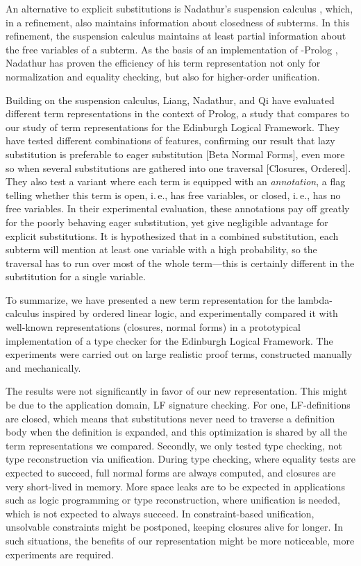 \documentclass[submission,copyright,creativecommons]{eptcs}
\newcommand{\abbrev}[1]{#1} \newcommand{\cf}{\abbrev{cf.}\ }
\newcommand{\ie}{\abbrev{i.\,e.}}
\begin{document}
An alternative to explicit substitutions is Nadathur's suspension
calculus \cite{nadathur:jflp99}, which, in a refinement, also
maintains information about closedness of subterms.  In this
refinement, the suspension calculus maintains at least partial
information about the free variables of a subterm.  
As the basis of an implementation of
-Prolog \cite{nadathur:flops01}, 
Nadathur has proven the efficiency of his term
representation not only for normalization and equality checking, but
also for higher-order unification.

Building on the suspension calculus,
Liang, Nadathur, and Qi \cite{liangNadathurQi:jar05} have evaluated
different term representations in the context of Prolog, a
study that compares to our study of term representations for the
Edinburgh Logical Framework.  They have tested different combinations
of features, confirming our result that lazy substitution is 
preferable to eager substitution {[Beta Normal Forms]},
even more so when several substitutions are gathered into one
traversal {[Closures, Ordered]}.  They also test a variant where
each term is equipped with an \emph{annotation}, a flag telling whether
this term is open, \ie, has free variables, or closed, \ie, has no
free variables.  In their experimental evaluation, these annotations
pay off greatly for the poorly behaving eager substitution, yet give
negligible advantage for explicit substitutions.  It is
hypothesized that in a combined substitution, each subterm will
mention at least one variable with a high probability, so the
traversal has to run over most of the whole term---this is certainly
different in the substitution for a single variable.

To summarize, we have presented a new term representation for the
lambda-calculus inspired by ordered linear logic, and experimentally
compared it with well-known representations (closures, normal forms)
in a prototypical implementation of a type checker for the Edinburgh
Logical Framework.  The experiments were carried out on large realistic
proof terms, constructed manually and mechanically.  

The results were not significantly in favor of our new representation.
This might be due to the application domain, LF signature checking.
For one, LF-definitions are closed, which means that substitutions
never need to traverse a definition body when the definition is
expanded, and this optimization is shared by all the term
representations we compared.  Secondly, we only tested type checking,
not type reconstruction via unification.  During type checking, where
equality tests are expected to succeed, full normal forms are always
computed, and closures are very short-lived in memory.  More space
leaks are to be expected in applications such as logic programming or
type reconstruction, where unification is needed, which is not
expected to always succeed.   In constraint-based unification,
unsolvable constraints might be postponed, keeping closures alive for
longer.  In such situations, the benefits of our representation might
be more noticeable, more experiments are required.
\end{document}
